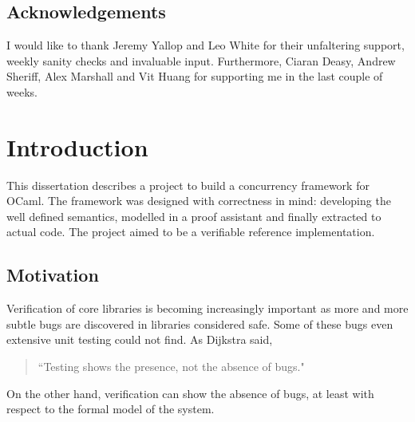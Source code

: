 \documentclass[12pt,twoside,notitlepage]{report}
\theoremstyle{plain}%
\theoremstyle{definition}
\theoremstyle{remark}
\begin{document}
\bigskip\bigskip


\leftline{\rule{12em}{1pt}}



\medskip
{}

\cleardoublepage


\tableofcontents

\listoffigures

\lstlistoflistings

\listoftheorems[numwidth=3em]



\newpage
\section*{Acknowledgements}
I would like to thank Jeremy Yallop and Leo White for their unfaltering support, weekly sanity checks and invaluable input. Furthermore, Ciaran Deasy, Andrew Sheriff, Alex Marshall and Vit Huang for supporting me in the last couple of weeks.

\cleardoublepage        %

\setcounter{page}{1}
\pagestyle{headings}
\chapter{Introduction}

This dissertation describes a project to build a concurrency framework for OCaml. The framework was designed with correctness in mind: developing the well defined semantics, modelled in a proof assistant and finally extracted to actual code. The project aimed to be a verifiable reference implementation. 

\section{Motivation}
Verification of core libraries is becoming increasingly important as more and more subtle bugs are discovered in libraries considered safe. Some of these bugs even extensive unit testing could not find. As Dijkstra said, \begin{quote}``Testing shows the presence, not the absence of bugs."\end{quote} On the other hand, verification can show the absence of bugs, at least with respect to the formal model of the system.
\end{document}

